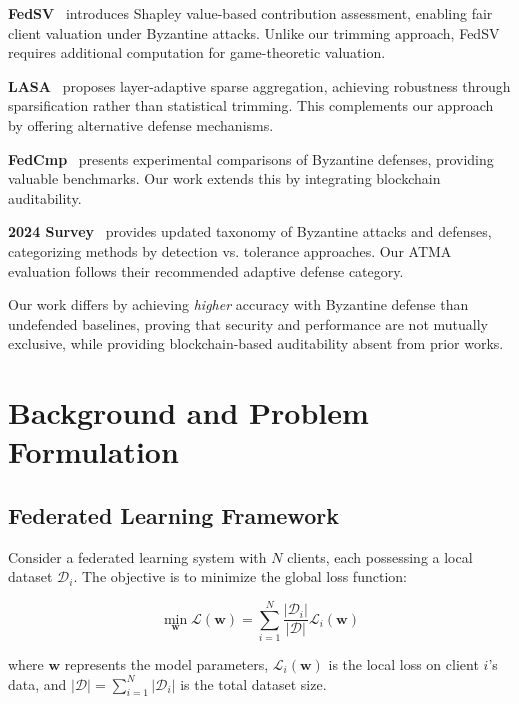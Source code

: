 \documentclass[12pt,a4paper,onecolumn]{article}
\begin{document}
\textbf{FedSV}~\cite{xu2024fedsv} introduces Shapley value-based contribution assessment, enabling fair client valuation under Byzantine attacks. Unlike our trimming approach, FedSV requires additional computation for game-theoretic valuation.

\textbf{LASA}~\cite{wang2024lasa} proposes layer-adaptive sparse aggregation, achieving robustness through sparsification rather than statistical trimming. This complements our approach by offering alternative defense mechanisms.

\textbf{FedCmp}~\cite{li2024fedcmp} presents experimental comparisons of Byzantine defenses, providing valuable benchmarks. Our work extends this by integrating blockchain auditability.

\textbf{2024 Survey}~\cite{rodriguez2024survey} provides updated taxonomy of Byzantine attacks and defenses, categorizing methods by detection vs. tolerance approaches. Our ATMA evaluation follows their recommended adaptive defense category.

Our work differs by achieving \textit{higher} accuracy with Byzantine defense than undefended baselines, proving that security and performance are not mutually exclusive, while providing blockchain-based auditability absent from prior works.

\section{Background and Problem Formulation}
\label{sec:background}

\subsection{Federated Learning Framework}

Consider a federated learning system with $N$ clients, each possessing a local dataset $\mathcal{D}_i$. The objective is to minimize the global loss function:

\begin{equation}
\min_{\mathbf{w}} \mathcal{L}(\mathbf{w}) = \sum_{i=1}^{N} \frac{|\mathcal{D}_i|}{|\mathcal{D}|} \mathcal{L}_i(\mathbf{w})
\label{eq:global_loss}
\end{equation}

where $\mathbf{w}$ represents the model parameters, $\mathcal{L}_i(\mathbf{w})$ is the local loss on client $i$'s data, and $|\mathcal{D}| = \sum_{i=1}^{N} |\mathcal{D}_i|$ is the total dataset size.
\end{document}
